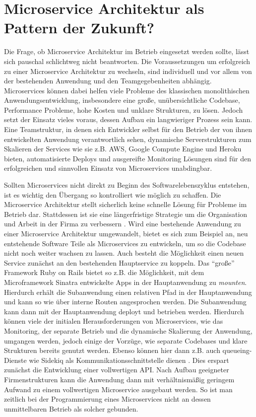 \chapter{Microservice Architektur als Pattern der Zukunft?}

Die Frage, ob Microservice Architektur im Betrieb eingesetzt werden sollte, lässt sich pauschal schlichtweg nicht beantworten. Die Voraussetzungen um erfolgreich zu einer Microservice Architektur zu wechseln, sind individuell und vor allem von der bestehenden Anwendung und den Teamgegebenheiten abhängig. Microservices können dabei helfen viele Probleme des klassischen monolithischen Anwendungsentwicklung, insbesondere eine große, unübersichtliche Codebase, Performance Probleme, hohe Kosten und unklare Strukturen, zu lösen. Jedoch setzt der Einsatz vieles voraus, dessen Aufbau ein langwieriger Prozess sein kann. Eine Teamstruktur, in denen sich Entwickler selbst für den Betrieb der von ihnen entwickelten Anwendung verantwortlich sehen, dynamische Serverstrukturen  zum Skalieren der Services wie sie z.B. AWS, Google Compute Engine und Heroku bieten, automatisierte Deploys und ausgereifte Monitoring Lösungen sind für den erfolgreichen und sinnvollen Einsatz von Microservices unabdingbar.

Sollten Microservices nicht direkt zu Beginn des Softwarelebenszyklus entstehen, ist es wichtig den Übergang so kontrolliert wie möglich zu schaffen. Die Microservice Architektur stellt sicherlich keine schnelle Lösung für Probleme im Betrieb dar. Stattdessen ist sie eine längerfristige Strategie um die Organisation und Arbeit in der Firma zu verbessern \cite{newman2015building}. Wird eine bestehende Anwendung zu einer Microservice Architektur umgewandelt, bietet es sich zum Beispiel an, neu entstehende Software Teile als Microservices zu entwickeln, um so die Codebase nicht noch weiter wachsen zu lassen. Auch besteht die Möglichkeit einen neuen Service zunächst an den bestehenden Hauptservice zu koppeln. Das ``große'' Framework Ruby on Rails bietet so z.B. die Möglichkeit, mit dem Microframework Sinatra entwickelte Apps in der Hauptanwendung zu \textit{mounten}. Hierdurch erhält die Subanwendung einen relativen Pfad in der Hauptanwendung und kann so wie über interne Routen angesprochen werden. Die Subanwendung kann dann mit der Hauptanwendung deployt und betrieben werden. Hierdurch können viele der initialen Herausforderungen von Microservices, wie das Monitoring, der separate Betrieb und die dynamische Skalierung der Anwendung, umgangen werden, jedoch einige der Vorzüge, wie separate Codebases und klare Strukturen bereits genutzt werden. Ebenso können hier dann z.B. auch queueing-Dienste wie Sidekiq als Kommunikationsschnittstelle dienen \cite[vgl.][]{sidekiqmessaging}. Dies erspart zunächst die Entwicklung einer vollwertigen API. Nach Aufbau geeigneter Firmenstrukturen kann die Anwendung dann mit verhältnismäßig geringem Aufwand zu einem vollwertigen Microservice ausgebaut werden. So ist man zeitlich bei der Programmierung eines Microservices nicht an dessen unmittelbaren Betrieb als solcher gebunden.

